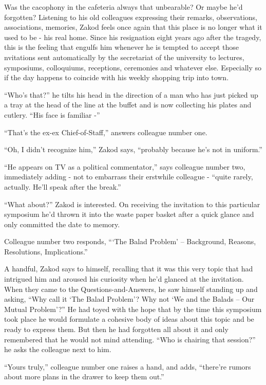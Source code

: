 \documentclass[twoside,11pt]{book}
\begin{document}
Was the cacophony in the cafeteria always that unbearable? Or maybe he'd forgotten?  Listening to his old colleagues
expressing their remarks, observations, associations, memories, Zakod feels once again that this place is no longer
what it used to be -  his real home.  Since his resignation eight years ago after the tragedy, this is the feeling that
engulfs him whenever he is tempted to accept those nvitations sent automatically by the secretariat of the university
to lectures, symposiums, colloquiums, receptions, ceremonies and whatever else. Especially so if the day happens to
coincide with his weekly shopping trip into town.

``Who's that?'' he tilts his head in the direction of a man who has just picked up a tray at
the head of the line at the buffet and is now collecting his plates and cutlery. ``His face is familiar
-''

``That's the ex-ex Chief-of-Staff,'' answers colleague number one.

``Oh, I didn't recognize him,'' Zakod says, ``probably because he's not in
uniform.''

``He appears on TV as a political commentator,'' says colleague number two, immediately adding
- not to embarrass their erstwhile colleague - ``quite rarely, actually. He'll speak after the
break.''

``What about?'' Zakod is interested. On receiving the invitation to this particular symposium
he'd thrown it into the waste paper basket after a quick glance and only committed the date to memory.

Colleague number two responds, ``{`The Balad Problem'} -- Background, Reasons, Resolutions,
Implications.''

A handful, Zakod says to himself, recalling that it was this very topic that had intrigued him and aroused his curiosity
when he'd glanced at the invitation. When they came to the
Questions-and-Answers, he saw himself standing up and asking, ``Why call it `The Balad
Problem'? Why not `We and the Balads -- Our Mutual Problem'?'' He had toyed with the hope that by the
time this symposium took place he would formulate a cohesive body of ideas about this topic and be
ready to express them. But then he had forgotten all about it and only remembered that he would not mind attending.
``Who is chairing that session?'' he asks the colleague next to him.

``Yours truly,'' colleague number one raises a hand, and adds, ``there're rumors
about more plans in the drawer to keep them out.''
\end{document}

